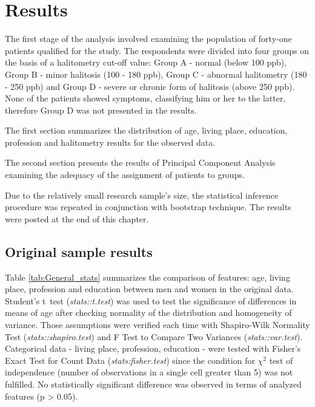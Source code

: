 \documentclass[12pt,a4paper,notitlepage]{report}
\begin{document}
\chapter{Results}

The first stage of the analysis involved examining the population of forty-one patients qualified for the study. The respondents were divided into four groups on the basis of a halitometry cut-off value: Group A - normal (below 100 ppb), Group B - minor halitosis (100 - 180 ppb), Group C - abnormal halitometry (180 - 250 ppb) and Group D - severe or chronic form of halitosis (above 250 ppb).  None of the patients showed symptoms, classifying him or her to the latter, therefore Group D was not presented in the results. 

The first section summarizes the distribution of age, living place, education, profession and halitometry results for the observed data. 

The second section presents the results of Principal Component Analysis examining the adequacy of the assignment of patients to groups.

Due to the relatively small research sample's size, the statistical inference procedure was repeated in conjunction with bootstrap technique. The results were posted at the end of this chapter.

\section{Original sample results}

Table \ref{tab:General_stats} summarizes the comparison of features: age, living place, profession and education between men and women in the original data. Student's \mbox{t test} (\textit{stats::t.test}) was used to test the significance of differences in means of age after checking normality of the distribution and homogeneity of variance. Those assumptions were verified each time with Shapiro-Wilk Normality Test (\textit{stats::shapiro.test}) and F Test to Compare Two Variances (\textit{stats::var.test}). 
Categorical data - living place, profession, education - were tested with Fisher's Exact Test for Count Data (\textit{stats:fisher.test}) since the condition for  $\chi^2 $ test of independence (number of observations in a single cell greater than 5) was not fulfilled. 
No statistically significant difference was observed in terms of analyzed features (p > 0.05). 
\end{document}
